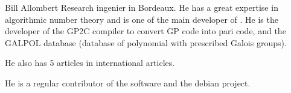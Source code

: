 \begin{participant}[type=PI,PM=6,salary=6000,gender=male]{Bill Allombert}
Research ingenier in Bordeaux. He has a great expertise in
algorithmic number theory and is one of the main developer of \PariGP.
He is the developer of the GP2C compiler to convert GP code into
pari code, and the GALPOL database (database of polynomial with
prescribed Galois groups).

He also has 5 articles in international articles.

He is a regular contributor of the software \GAP and the debian project.
\end{participant}

